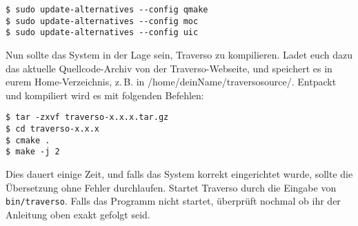 \begin{verbatim}
$ sudo update-alternatives --config qmake
$ sudo update-alternatives --config moc
$ sudo update-alternatives --config uic
\end{verbatim}

Nun sollte das System in der Lage sein, Traverso zu kompilieren. Ladet euch dazu das aktuelle Quellcode-Archiv von der Traverso-Webseite, und speichert es in eurem Home-Verzeichnis, z.\,B. in /home/deinName/traversosource/. Entpackt und kompiliert wird es mit folgenden Befehlen:

\begin{verbatim}
$ tar -zxvf traverso-x.x.x.tar.gz
$ cd traverso-x.x.x
$ cmake .
$ make -j 2
\end{verbatim}

Dies dauert einige Zeit, und falls das System korrekt eingerichtet wurde, sollte die Übersetzung ohne Fehler durchlaufen. Startet Traverso durch die Eingabe von \texttt{bin/traverso}. Falls das Programm nicht startet, überprüft nochmal ob ihr der Anleitung oben exakt gefolgt seid.
